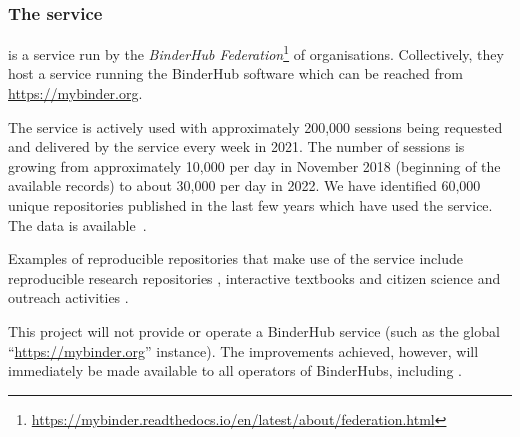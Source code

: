 \subsubsection{The \mybinder{} service}\label{sec:mybinder}

\emph{\mybinder{}} is a service run by the \emph{BinderHub
Federation}\footnote{\url{https://mybinder.readthedocs.io/en/latest/about/federation.html}}
of organisations. Collectively, they host a service running the BinderHub software
which can be reached from \url{https://mybinder.org}.

The service is actively used with approximately 200,000 sessions being
requested and delivered by the \mybinder{} service every week in 2021. The number
of sessions is growing from approximately 10,000 per day in November 2018
(beginning of the available records) to about 30,000 per day in 2022. We have
identified 60,000 unique repositories published in the last few years which have
used the \mybinder{} service. The data is available~\cite{mybinder-archive}.

Examples of reproducible repositories that make use of the \mybinder service
include reproducible research repositories
\cite{GitHubRepoExampleAlbert2016,Beg2021}, interactive textbooks
\cite{Fangohr2022,Zeller2022} and citizen science and outreach activities
\cite{ligo-open-science,OSCOVIDA2022}.

This \TheProject{} project will not provide or operate a BinderHub service (such as the global
``\url{https://mybinder.org}'' instance). The improvements achieved, however, will immediately
be made available to all operators of BinderHubs, including \mybinder{}.






